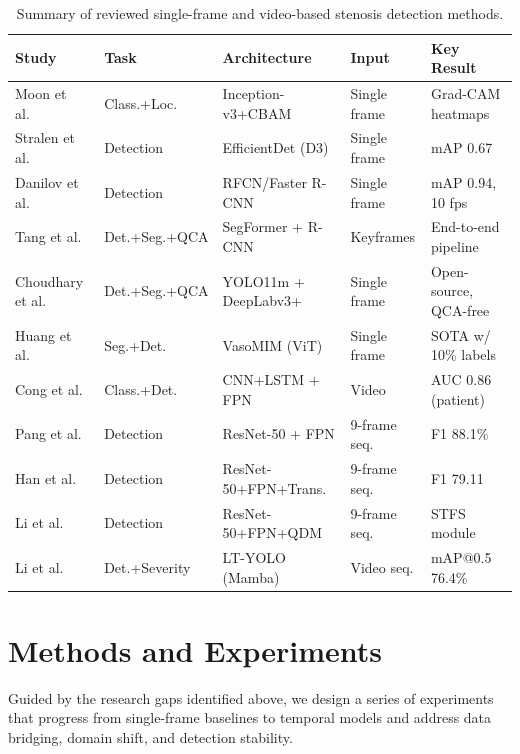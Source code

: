 \documentclass{article}
\begin{document}
\begin{table}[ht]
\centering
\caption{Summary of reviewed single-frame and video-based stenosis detection methods.}
\label{tab:summary}
\footnotesize
\begin{tabular}{p{3.2cm} p{2.0cm} p{2.8cm} p{1.8cm} p{2.5cm}}
\hline
\textbf{Study} & \textbf{Task} & \textbf{Architecture} & \textbf{Input} & \textbf{Key Result} \\
\hline
Moon et al.~\cite{MOON2021105819} & Class.+Loc. & Inception-v3+CBAM & Single frame & Grad-CAM heatmaps \\
Stralen et al.~\cite{attentionstenosis} & Detection & EfficientDet (D3) & Single frame & mAP 0.67 \\
Danilov et al.~\cite{Danilov2021} & Detection & RFCN/Faster R-CNN & Single frame & mAP 0.94, 10 fps \\
Tang et al.~\cite{aipoweredrealtime} & Det.+Seg.+QCA & SegFormer + R-CNN & Keyframes & End-to-end pipeline \\
Choudhary et al.~\cite{choudhary2026odysseiopensourceendtoendframework} & Det.+Seg.+QCA & YOLO11m + DeepLabv3+ & Single frame & Open-source, QCA-free \\
Huang et al.~\cite{huang2026vasomim} & Seg.+Det. & VasoMIM (ViT) & Single frame & SOTA w/ 10\% labels \\
Cong et al.~\cite{fvcm} & Class.+Det. & CNN+LSTM + FPN & Video & AUC 0.86 (patient) \\
Pang et al.~\cite{PANG2021101900} & Detection & ResNet-50 + FPN & 9-frame seq. & F1 88.1\% \\
Han et al.~\cite{HAN2023106546} & Detection & ResNet-50+FPN+Trans. & 9-frame seq. & F1 79.11 \\
Li et al.~\cite{STQD-Det} & Detection & ResNet-50+FPN+QDM & 9-frame seq. & STFS module \\
Li et al.~\cite{li2025ltyolo} & Det.+Severity & LT-YOLO (Mamba) & Video seq. & mAP@0.5 76.4\% \\
\hline
\end{tabular}
\end{table}

\section{Methods and Experiments}

Guided by the research gaps identified above, we design a series of experiments that progress from single-frame baselines to temporal models and address data bridging, domain shift, and detection stability.
\end{document}
